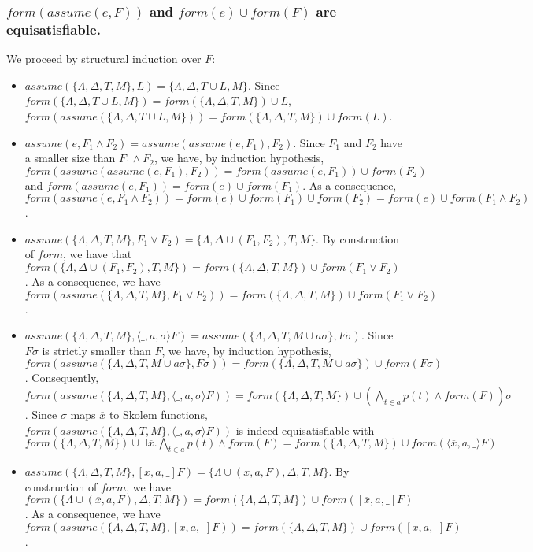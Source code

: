 \documentclass[a4paper,10pt]{report}
\newcommand{\F}{\mathit{form}}
\newcommand{\A}{\mathit{assume}}
\begin{document}
\subsubsection*{$\F(\A(e,F))$ and $\F(e)\cup\F(F)$ are equisatisfiable.}
\noindent
We proceed by structural induction over $F$:
\begin{itemize}
 \item $\A(\{\Lambda,\Delta,T,M\},L)=\{\Lambda,\Delta,T\cup L,M\}$.
Since $\F(\{\Lambda,\Delta,T\cup L,M\})=\F(\{\Lambda,\Delta,T,M\})\cup L$,
$\F(\A(\{\Lambda,\Delta,T\cup L,M\}))=\F(\{\Lambda,\Delta,T,M\})\cup\F(L)$.
 \item $\A(e,F_1\wedge F_2)=\A(\A(e,F_1),F_2)$. Since $F_1$ and $F_2$ have a smaller size than
$F_1\wedge F_2$, we have, by induction hypothesis,
$\F(\A(\A(e,F_1),F_2))=\F(\A(e,F_1))\cup\F(F_2)$ and $\F(\A(e,F_1))=\F(e)\cup\F(F_1)$.
As a consequence, $\F(\A(e,F_1\wedge F_2))=\F(e)\cup\F(F_1)\cup\F(F_2)=\F(e)\cup\F(F_1\wedge F_2)$.
 \item $\A(\{\Lambda,\Delta,T,M\},F_1\vee F_2)=\{\Lambda,\Delta\cup(F_1,F_2),T,M\}$.
By construction of $\F$, we have that
$\F(\{\Lambda,\Delta\cup(F_1,F_2),T,M\})=\F(\{\Lambda,\Delta,T,M\})\cup\F(F_1\vee F_2)$.
As a consequence, we have $\F(\A(\{\Lambda,\Delta,T,M\},F_1\vee F_2))=
\F(\{\Lambda,\Delta,T,M\})\cup\F(F_1\vee F_2)$.
 \item $\A(\{\Lambda,\Delta,T,M\},\langle\_,a,\sigma\rangle F)=
\A(\{\Lambda,\Delta,T,M\cup a\sigma\},F\sigma)$. Since $F\sigma$ is strictly smaller than $F$,
we have, by induction hypothesis, $\F(\A(\{\Lambda,\Delta,T,M\cup a\sigma\},F\sigma))=
\F(\{\Lambda,\Delta,T,M\cup a\sigma\})\cup\F(F\sigma)$. Consequently,
$\F(\A(\{\Lambda,\Delta,T,M\},\langle\_,a,\sigma\rangle F))=
\F(\{\Lambda,\Delta,T,M\})\cup(\bigwedge_{t\in a} p(t)\wedge\F(F))\sigma$.
Since $\sigma$ maps $\overline x$ to Skolem functions,
$\F(\A(\{\Lambda,\Delta,T,M\},\langle\_,a,\sigma\rangle F))$ is indeed equisatisfiable with
$\F(\{\Lambda,\Delta,T,M\})\cup\exists\overline x.\bigwedge_{t\in a} p(t)\wedge\F(F)=
\F(\{\Lambda,\Delta,T,M\})\cup\F(\langle\overline x,a,\_\rangle F)$
 \item $\A(\{\Lambda,\Delta,T,M\},[\overline x,a,\_]F)=\{\Lambda\cup(\overline x,a,F),\Delta,T,M\}$.
By construction of $\F$, we have
$\F(\{\Lambda\cup(\overline x,a,F),\Delta,T,M\})=\F(\{\Lambda,\Delta,T,M\})\cup
\F([\overline x,a,\_]F)$. As a consequence, we have 
$\F(\A(\{\Lambda,\Delta,T,M\},[\overline x,a,\_]F))=
\F(\{\Lambda,\Delta,T,M\})\cup\F([\overline x,a,\_]F)$.
\end{itemize}
\end{document}
